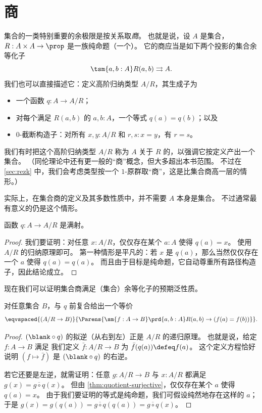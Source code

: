 \section{商}
\label{sec:set-quotients}

集合的一类特别重要的余极限是按关系取\emph{商}。
也就是说，设 $A$ 是集合，$R:A\times A \to \prop$ 是一族纯命题（一个）。
%
%
它的商应当是如下两个投影的集合余等化子
\[ \tsm{a,b:A} R(a,b) \rightrightarrows A. \]
我们也可以直接描述它：定义高阶归纳类型 $A/R$，其生成子为
%
%
%
\begin{itemize}
\item 一个函数 $q:A\to A/R$；
\item 对每个满足 $R(a,b)$ 的 $a,b:A$，一个等式 $q(a)=q(b)$；以及
\item $0$-截断构造子：对所有 $x,y:A/R$ 和 $r,s:x=y$，有 $r=s$。
\end{itemize}
我们有时把这个高阶归纳类型 $A/R$ 称为 $A$ 关于 $R$ 的，以强调它按定义产出一个集合。
（同伦理论中还有更一般的“商”概念，但大多超出本书范围。
不过在 \cref{sec:rezk} 中，我们会考虑类型按一个 $1$-原群取“商”，这是比集合商高一层的情形。）

\begin{rmk}\label{rmk:quotient-of-non-set}
  实际上，在集合商的定义及其多数性质中，并不需要 $A$ 本身是集合。
  不过通常最有意义的仍是这个情形。
\end{rmk}

\begin{lem}\label{thm:quotient-surjective}
  函数 $q:A\to A/R$ 是满射。
\end{lem}
\begin{proof}
  我们要证明：对任意 $x:A/R$，仅仅存在某个 $a:A$ 使得 $q(a)=x$。
  使用 $A/R$ 的归纳原理即可。
  第一种情形是平凡的：若 $x$ 是 $q(a)$，那么当然仅仅存在一个 $a$ 使得 $q(a)=q(a)$。
  而且由于目标是纯命题，它自动尊重所有路径构造子，因此结论成立。
\end{proof}

现在我们可以证明集合商满足（集合）余等化子的预期泛性质。

\begin{lem}\label{thm:quotient-ump}
  对任意集合 $B$，与 $q$ 前复合给出一个等价
  \[ \eqvspaced{(A/R \to B)}{\Parens{\sm{f:A\to B} \prd{a,b:A} R(a,b) \to (f(a)=f(b))}}.\]
\end{lem}
\begin{proof}
  $(\blank\circ q)$ 的拟逆（从右到左）正是 $A/R$ 的递归原理。
  也就是说，给定 $f:A\to B$ 满足
   我们定义 $\bar f:A/R\to B$ 为 $\bar f(q(a))\defeq f(a)$。
  这个定义方程恰好说明 $(f\mapsto \bar f)$ 是 $(\blank\circ q)$ 的右逆。

  若它还要是左逆，就需证明：任意 $g:A/R\to B$ 与 $x:A/R$ 都满足 $g(x) = \overline{g\circ q}(x)$。
  但由 \cref{thm:quotient-surjective}，仅仅存在某个 $a$ 使得 $q(a)=x$。
  由于我们要证明的等式是纯命题，我们可假设纯然地存在这样的 $a$；于是
  $g(x) = g(q(a)) = \overline{g\circ q}(q(a)) = \overline{g\circ q}(x)$。
\end{proof}

